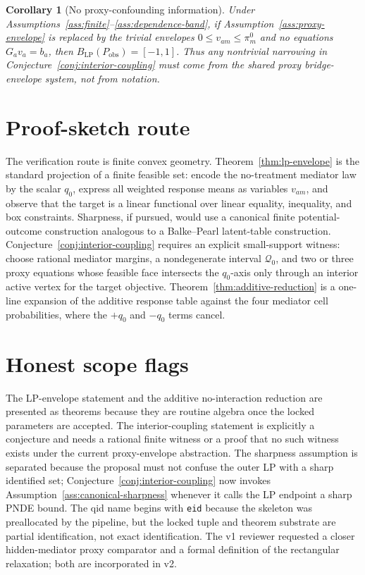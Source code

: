 \documentclass[11pt]{article}
\theoremstyle{definition}
\theoremstyle{plain}
\newtheorem{corollary}{Corollary}
\theoremstyle{remark}
\begin{document}
\begin{corollary}[No proxy-confounding information]\label{cor:no-proxy}
Under Assumptions~\ref{ass:finite}--\ref{ass:dependence-band}, if
Assumption~\ref{ass:proxy-envelope} is replaced by the trivial envelopes
\(0\le v_{am}\le \pi^0_m\) and no equations \(G_a v_a=b_a\), then
\(B_{\mathrm{LP}}(P_{\mathrm{obs}})=[-1,1]\).  Thus any nontrivial narrowing
in Conjecture~\ref{conj:interior-coupling} must come from the shared proxy
bridge-envelope system, not from notation.
\end{corollary}

\section{Proof-sketch route}
The verification route is finite convex geometry.  Theorem~\ref{thm:lp-envelope}
is the standard projection of a finite feasible set: encode the no-treatment
mediator law by the scalar \(q_0\), express all weighted response means as
variables \(v_{am}\), and observe that the target is a linear functional over
linear equality, inequality, and box constraints.  Sharpness, if pursued, would
use a canonical finite potential-outcome construction analogous to a
Balke--Pearl latent-table construction.  Conjecture~\ref{conj:interior-coupling}
requires an explicit small-support witness: choose rational mediator margins,
a nondegenerate interval \(\mathcal Q_0\), and two or three proxy equations
whose feasible face intersects the \(q_0\)-axis only through an interior active
vertex for the target objective.  Theorem~\ref{thm:additive-reduction} is a
one-line expansion of the additive response table against the four mediator
cell probabilities, where the \(+q_0\) and \(-q_0\) terms cancel.

\section{Honest scope flags}
The LP-envelope statement and the additive no-interaction reduction are
presented as theorems because they are routine algebra once the locked
parameters are accepted.  The interior-coupling statement is explicitly a
conjecture and needs a rational finite witness or a proof that no such witness
exists under the current proxy-envelope abstraction.  The sharpness assumption
is separated because the proposal must not confuse the outer LP with a sharp
identified set; Conjecture~\ref{conj:interior-coupling} now invokes
Assumption~\ref{ass:canonical-sharpness} whenever it calls the LP endpoint a
sharp PNDE bound.  The qid
name begins with \texttt{eid} because the skeleton was preallocated by the
pipeline, but the locked tuple and theorem substrate are partial
identification, not exact identification.  The v1 reviewer requested a closer
hidden-mediator proxy comparator and a formal definition of the rectangular
relaxation; both are incorporated in v2.
\end{document}
